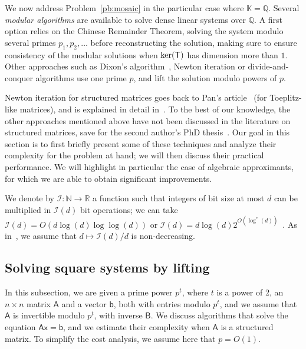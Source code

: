 \documentclass[sigconf]{acmart}
\newcommand{\vb}{\ensuremath{\mathsf{b}}}
\newcommand{\vx}{\ensuremath{\mathsf{x}}}
\newcommand{\mA}{\ensuremath{\mathsf{A}}}
\newcommand{\mB}{\ensuremath{\mathsf{B}}}
\newcommand{\mT}{\ensuremath{\mathsf{T}}}
\newcommand{\K}{\ensuremath{\mathbb{K}}}
\newcommand{\Q}{\ensuremath{\mathbb{Q}}}
\theoremstyle{acmdefinition}
\begin{document}
We now address Problem~\ref{pb:mosaic} in the particular case where
$\K=\Q$. Several {\em modular algorithms} are available to solve dense
linear systems over $\Q$. A first option relies on the Chinese
Remainder Theorem, solving the system modulo several primes
$p_1,p_2,\dots$ before reconstructing the solution, making sure to
ensure consistency of the modular solutions when ${\rm ker}(\mT)$ has
dimension more than $1$. Other approaches such as Dixon's
algorithm~\cite{Dixon82}, Newton iteration or divide-and-conquer
algorithms use one prime $p$, and lift the solution modulo powers of
$p$.

Newton iteration for structured matrices goes back to Pan's
article~\cite{Pan92} (for Toeplitz-like matrices), and is explained in
detail in~\cite[Chapter~7]{Pan01}. To the best of our knowledge, the
other approaches mentioned above have not been discussed in the
literature on structured matrices, save for the second author's PhD
thesis~\cite{Lebreton12}. Our goal in this section is to first
briefly present some of these techniques and analyze their complexity
for the problem at hand; we will then discuss their practical
performance. We will highlight in particular the case of algebraic
approximants, for which we are able to obtain significant
improvements.

We denote by $\mathscr{I}:\mathbb{N} \to \mathbb{R}$ a function such
that integers of bit size at most $d$ can be multiplied in
$\mathscr{I}(d)$ bit operations; we can take $\mathscr{I}(d)=O(d
\log(d) \log\log(d))$ or $\mathscr{I}(d)=d \log(d)
2^{O(\log^*(d))}$~\cite{ScSt71,Furer07}. As in~\cite{GaGe13}, we
assume that $d\mapsto \mathscr{I}(d)/d$ is non-decreasing.


\vspace{-5px}
\subsection{Solving square systems by lifting}
\label{ssec:liftsquare}

In this subsection, we are given a prime power $p^t$, where $t$ is a
power of 2, an $n \times n$ matrix $\mA$ and a vector $\vb$, both with
entries modulo $p^t$, and we assume that $\mA$ is invertible modulo
$p^t$, with inverse $\mB$. We discuss algorithms that solve the
equation $\mA \vx = \vb$, and we estimate their complexity when $\mA$
is a structured matrix. To simplify the cost analysis, we assume here
that $p=O(1)$.
\end{document}
